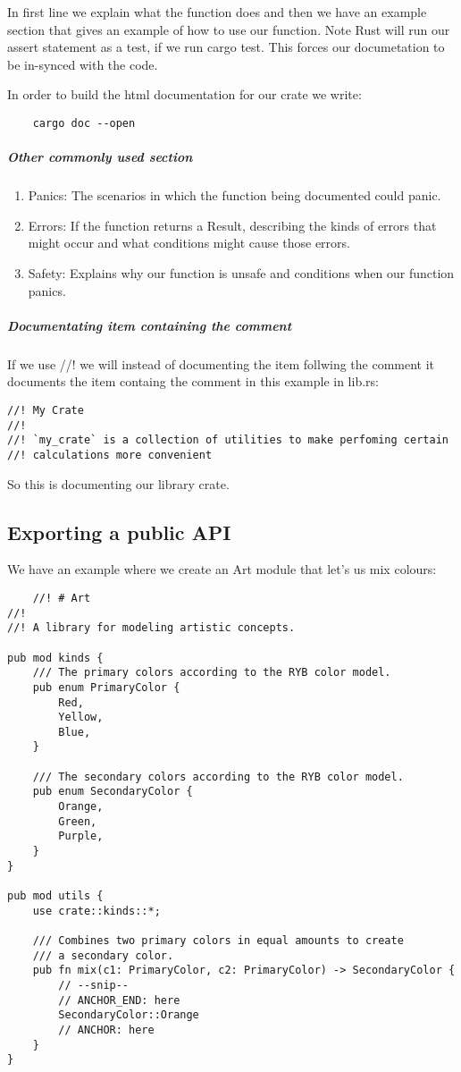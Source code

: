 \begin{definition}
In first line we explain what the function does and then we have an example section that gives an example of how to use our function. Note Rust will run our assert statement as a test, if we run cargo test. This forces our documetation to be in-synced with the code.

In order to build the html documentation for our crate we write:\begin{lstlisting}
    cargo doc --open
\end{lstlisting}

\subparagraph*{Other commonly used section}\begin{enumerate}
    \item Panics: The scenarios in which the function being documented could panic.
    \item Errors: If the function returns a Result, describing the kinds of errors that might occur and what conditions might cause those errors.
    \item Safety: Explains why our function is unsafe and conditions when our function panics.
\end{enumerate}
\end{definition}

\subparagraph*{Documentating item containing the comment}

If we use //! we will instead of documenting the item follwing the comment it documents the item containg the comment in this example in lib.rs:\begin{lstlisting}    
//! My Crate
//! 
//! `my_crate` is a collection of utilities to make perfoming certain
//! calculations more convenient
\end{lstlisting}

So this is documenting our library crate.

\subsection{Exporting a public API}

We have an example where we create an Art module that let's us mix colours:\begin{lstlisting}
    //! # Art
//!
//! A library for modeling artistic concepts.

pub mod kinds {
    /// The primary colors according to the RYB color model.
    pub enum PrimaryColor {
        Red,
        Yellow,
        Blue,
    }

    /// The secondary colors according to the RYB color model.
    pub enum SecondaryColor {
        Orange,
        Green,
        Purple,
    }
}

pub mod utils {
    use crate::kinds::*;

    /// Combines two primary colors in equal amounts to create
    /// a secondary color.
    pub fn mix(c1: PrimaryColor, c2: PrimaryColor) -> SecondaryColor {
        // --snip--
        // ANCHOR_END: here
        SecondaryColor::Orange
        // ANCHOR: here
    }
}
\end{lstlisting}

